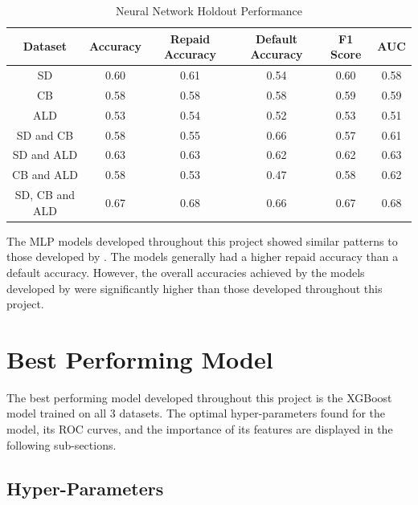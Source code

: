 \begin{table}[H]
\begin{center}
\begin{tabular}{|c|c|c|c|c|c|} 
\hline
\multicolumn{1}{|c|}{Dataset}
&\multicolumn{1}{|c|}{Accuracy}
&\multicolumn{1}{|c|}{Repaid Accuracy}
&\multicolumn{1}{|c|}{Default Accuracy}
&\multicolumn{1}{|c|}{F1 Score}
&\multicolumn{1}{|c|}{AUC}\\
\hline
SD & 0.60 & 0.61 & 0.54 & 0.60 & 0.58    \\
\hline
CB & 0.58 & 0.58 & 0.58 & 0.59 & 0.59    \\
\hline
ALD & 0.53 & 0.54 & 0.52 & 0.53 & 0.51    \\
\hline
SD and CB & 0.58 & 0.55 & 0.66 & 0.57 & 0.61    \\
\hline
SD and ALD & 0.63 & 0.63 & 0.62 & 0.62 & 0.63   \\
\hline
CB and ALD & 0.58 & 0.53 & 0.47 & 0.58 & 0.62    \\
\hline
SD, CB and ALD & 0.67 & 0.68 & 0.66 & 0.67 & 0.68    \\
\hline
\end{tabular}
\end{center}
\caption{Neural Network Holdout Performance}
\label{table:NN test}
\end{table}

\vspace{10pt}

The MLP models developed throughout this project showed similar patterns to those developed by \textcite{NNWest}. The models generally had a higher repaid accuracy than a default accuracy. However, the overall accuracies achieved by the models developed by \textcite{NNWest} were significantly higher than those developed throughout this project. \\



\section{Best Performing Model}

The best performing model developed throughout this project is the XGBoost model trained on all 3 datasets. The optimal hyper-parameters found for the model, its ROC curves, and the importance of its features are displayed in the following sub-sections.

\subsection{Hyper-Parameters}

